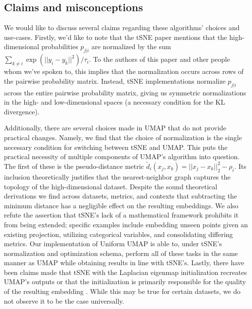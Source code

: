 \documentclass{article}
\theoremstyle{definition}
\begin{document}
\subsection{Claims and misconceptions}
We would like to discuss several claims regarding these algorithms' choices and use-cases. Firstly, we'd like to note that the tSNE paper mentions
that the high-dimensional probabilities $p_{j|i}$ are normalized by the sum $\sum_{k \neq i} \exp\left( ||y_i - y_k||^2 \right) / \tau_i$. To the authors of
this paper and other people whom we've spoken to, this implies that the normalization occurs across rows of the pairwise probability matrix. Instead, tSNE
implementations normalize $p_{j|i}$ across the entire pairwise probability matrix, giving us symmetric normalizations in the high- and low-dimensional spaces (a
necessary condition for the KL divergence).

Additionally, there are several choices made in UMAP that do not provide practical changes. Namely, we find that the choice of normalization is the
single necessary condition for switching between tSNE and UMAP.
This puts the practical necessity of multiple components of UMAP's algorithm into question. The first of these is the pseudo-distance metric $\tilde{d}_i(x_j, x_k) = ||x_j - x_k||_2^2
- \rho_i$. Its inclusion theoretically justifies that the nearest-neighbor graph captures the topology of the high-dimensional dataset. Despite the sound
theoretical derivations we find across datasets, metrics, and contexts that subtracting the minimum distance has a negligible effect on the resulting
embeddings. We also refute the assertion that tSNE's lack of a mathematical framework prohibits it from being
extended; specific examples include embedding unseen
points given an existing projection, utilizing categorical variables, and consolidating differing metrics. Our implementation of Uniform UMAP is able
to, under tSNE's normalization and optimization schema, perform all of these tasks in the same manner as UMAP while obtaining results in line with tSNE's. Lastly, there have been claims made that tSNE
with the Laplacian eigenmap initialization recreates UMAP's outputs \cite{kobak2019umap} or that the initialization is primarily responsible for the quality of
the resulting embedding \cite{kobak2021initialization}. While this may be true for certain datasets, we do not observe it to be the case universally.
\end{document}
